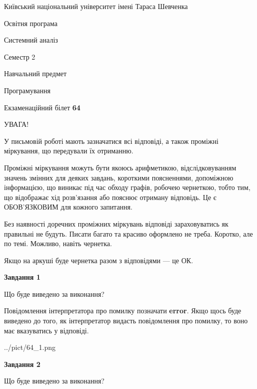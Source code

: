 \documentclass[12pt, ukrainian]{article}
\begin{document}
{{\begin {small}\par
{ \center  Київський національний університет імені Тараса Шевченка \par}
{\parbox {5 cm}{Освітня програма \hfill}{\parbox {7 cm}{Системний аналіз \hfill}}\parbox {6 cm}{\hfill Семестр 2}}\par
{\parbox {5 cm} {Навчальний предмет \hfill}\parbox {7 cm}{Програмування \hfill}\parbox {6cm}{\hfill}\par}\vspace{-7pt} \end{small}}{\center Екзаменаційний білет \No \textbf
{ 64 }\par}}
{
\begin {large}
УВАГА!

У письмовій роботі мають зазначатися всі відповіді, а також проміжні міркування, що передували їх отриманню.

Проміжні міркування можуть бути якоюсь арифметикою, відслідковуванням зна\-чень змінних для деяких завдань,
короткими поясненнями, допоміжною інформацією, що виникає під час обходу графів, робочею чернеткою,
тобто тим, що відображає хід розв’язання або пояснює отриману відповідь.
Це є ОБОВ’ЯЗКОВИМ для кожного запитання.

Без наявності доречних проміжних міркувань відповіді зараховуватись як правиль\-ні не будуть.
Писати багато та красиво оформлено не треба. Коротко, але по темі. Можли\-во, навіть чернетка.

Якщо на аркуші буде чернетка разом з відповідями --- це ОК.

\newpage

{\begin {center}\textbf{Завдання 1}\end {center}}\par
Що буде виведено за виконання?

Повідомлення інтерпретатора про помилку позначати \textbf{error}.
Якщо щось буде виведено до того, як інтерпретатор видасть повідомлення про помилку, 
то воно має вказуватись у відповіді. \par


\begin{center}
	{../pict/64_1.png}
\end{center}
\newpage

{\begin {center}\textbf{Завдання 2}\end {center}}\par
Що буде виведено за виконання?


\end{large}}
\end{document}
